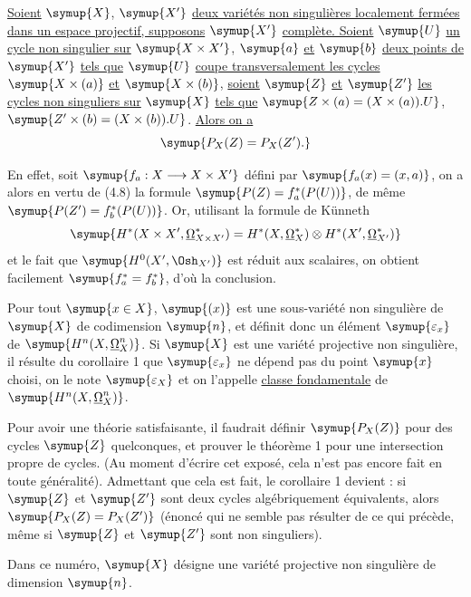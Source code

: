  \uline{Soient} $\symup{X}$, $\symup{X'}$ \uline{deux variétés non singulières
localement fermées dans un espace projectif, supposons} $\symup{X'}$ \uline{complète. Soient} $\symup{U}$
\uline{un cycle non singulier sur} $\symup{X\times X'}$, $\symup{a}$ \uline{et} $\symup{b}$ \uline{deux points de} $\symup{X'}$ \uline{tels que}
$\symup{U}$ \uline{coupe transversalement les cycles} $\symup{X\times(a)}$ \uline{et} $\symup{X\times(b)}$, \uline{soient} $\symup{Z}$
\uline{et} $\symup{Z'}$ \uline{les cycles non singuliers sur} $\symup{X}$ \uline{tels que}
$\symup{Z\times(a)=(X\times(a)).U}$, $\symup{Z'\times(b)=(X\times(b)).U}$.
\uline{Alors on a}
\[
  \symup{P_X(Z)=P_X(Z').}
\]

En effet, soit $\symup{f_a:X\longrightarrow X\times X'}$ défini par
$\symup{f_a(x)=(x,a)}$, on a alors en vertu de (4.8) la formule
$\symup{P(Z)=f_a^{*}(P(U))}$, de même $\symup{P(Z')=f_b^{*}(P(U))}$. Or, utilisant la formule de
Künneth
\[
  \symup{H^{*}(X\times X',\underline{\Omega}_{X\times X'}^{*})
  =H^{*}(X,\underline{\Omega}_X^{*})\otimes H^{*}(X',\underline{\Omega}_{X'}^{*})}
\]
et le fait que $\symup{H^{0}(X',\Osh_{X'})}$ est réduit aux scalaires, on obtient
facilement $\symup{f_a^{*}=f_b^{*}}$, d'où la conclusion.

Pour tout $\symup{x\in X}$, $\symup{(x)}$ est une sous-variété non singulière de $\symup{X}$ de
codimension $\symup{n}$, et définit donc un élément $\symup{\varepsilon_x}$ de
$\symup{H^{n}(X,\underline{\Omega}_X^{n})}$. Si $\symup{X}$ est une variété projective non singulière, il
résulte du corollaire 1 que $\symup{\varepsilon_x}$ ne dépend pas du point $\symup{x}$ choisi, on
le note $\symup{\varepsilon_X}$ et on l'appelle \uline{classe fondamentale} de
$\symup{H^{n}(X,\underline{\Omega}_X^{n})}$.

 Pour avoir une théorie satisfaisante, il faudrait définir
$\symup{P_X(Z)}$ pour des cycles $\symup{Z}$ quelconques, et prouver le théorème 1 pour une
intersection propre de cycles. (Au moment d'écrire cet exposé, cela n'est pas
encore fait en toute généralité). Admettant que cela est fait, le corollaire 1
devient : si $\symup{Z}$ et $\symup{Z'}$ sont deux cycles algébriquement équivalents, alors
$\symup{P_X(Z)=P_X(Z')}$ (énoncé qui ne semble pas résulter de ce qui précède, même si
$\symup{Z}$ et $\symup{Z'}$ sont non singuliers).


Dans ce numéro, $\symup{X}$ désigne une variété projective non singulière de dimension
$\symup{n}$.

